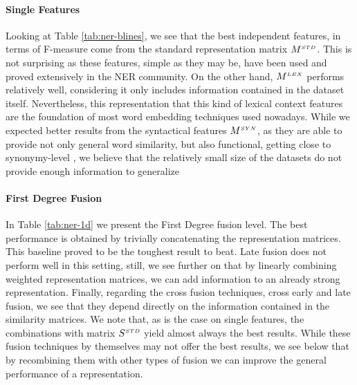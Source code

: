 \paragraph{Single Features}
Looking at Table \ref{tab:ner-blines}, we see that the best independent features, in terms of F-measure come from the standard representation matrix $M^{\scriptscriptstyle STD}$. This is not surprising as these features, simple as they may be, have been used and proved extensively in the NER community. On the other hand, $M^{\scriptscriptstyle LEX}$ performs relatively well, considering it only includes information contained in the dataset itself. Nevertheless, this representation that this kind of lexical context features are the foundation of most word embedding techniques used nowadays.
While we expected better results from the syntactical features $M^{\scriptscriptstyle SYN}$, as they are able to provide not only general word similarity, but also functional, getting close to synonymy-level \cite{LevyG14},  we believe that the relatively small size of the datasets do not provide enough information to generalize 
\paragraph{First Degree Fusion }
In Table \ref{tab:ner-1d} we present the First Degree fusion level. The best performance is obtained by trivially concatenating the representation matrices. This baseline proved to be the toughest result to beat. Late fusion does not perform well in this setting, still, we see further on that by linearly combining weighted representation matrices, we can add information to an already strong representation. Finally, regarding the cross fusion techniques, cross early and late fusion, we see that they depend directly on the information contained in the similarity matrices. We note that, as is the case on single features, the combinations with matrix $S^{\scriptscriptstyle STD}$ yield almost always the best results. While these fusion techniques by themselves may not offer the best results, we see below that by recombining them with other types of fusion we can improve the general performance of a representation.




